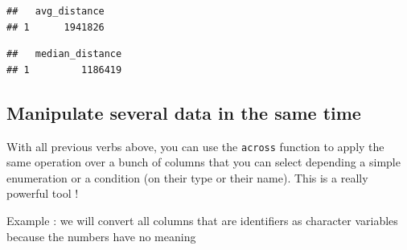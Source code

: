 \documentclass[
]{book}
\newenvironment{Shaded}{\begin{snugshade}}{\end{snugshade}}
\newcommand{\CommentTok}[1]{\textcolor[rgb]{0.56,0.35,0.01}{\textit{#1}}}
\newcommand{\ControlFlowTok}[1]{\textcolor[rgb]{0.13,0.29,0.53}{\textbf{#1}}}
\newcommand{\DataTypeTok}[1]{\textcolor[rgb]{0.13,0.29,0.53}{#1}}
\newcommand{\KeywordTok}[1]{\textcolor[rgb]{0.13,0.29,0.53}{\textbf{#1}}}
\newcommand{\NormalTok}[1]{#1}
\newcommand{\OperatorTok}[1]{\textcolor[rgb]{0.81,0.36,0.00}{\textbf{#1}}}
\newcommand{\StringTok}[1]{\textcolor[rgb]{0.31,0.60,0.02}{#1}}
\begin{document}
\begin{verbatim}
##   avg_distance
## 1      1941826
\end{verbatim}

\begin{Shaded}
\end{Shaded}

\begin{verbatim}
##   median_distance
## 1         1186419
\end{verbatim}

\hypertarget{manipulate-several-data-in-the-same-time}{%
\subsection{Manipulate several data in the same time}\label{manipulate-several-data-in-the-same-time}}

With all previous verbs above, you can use the \texttt{across} function to apply the same operation over a bunch of columns that you can select depending a simple enumeration or a condition (on their type or their name). This is a really powerful tool !

Example : we will convert all columns that are identifiers as character variables because the numbers have no meaning

\begin{Shaded}
\end{Shaded}
\end{document}
